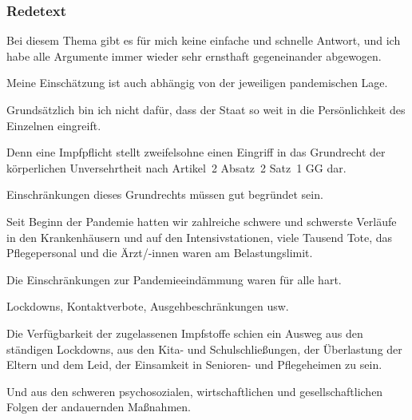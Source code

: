 \documentclass{article}
\begin{document}
\subsubsection{Redetext}
\colorbox{CustomColor0}{\parbox{\linewidth}{Bei diesem Thema gibt es für mich keine einfache und schnelle Antwort, und ich habe alle Argumente immer wieder sehr ernsthaft gegeneinander abgewogen.}}

\colorbox{CustomColor1}{\parbox{\linewidth}{Meine Einschätzung ist auch abhängig von der jeweiligen pandemischen Lage.}}

\colorbox{CustomColor2}{\parbox{\linewidth}{Grundsätzlich bin ich nicht dafür, dass der Staat so weit in die Persönlichkeit des Einzelnen eingreift.}}

\colorbox{CustomColor3}{\parbox{\linewidth}{Denn eine Impfpflicht stellt zweifelsohne einen Eingriff in das Grundrecht der körperlichen Unversehrtheit nach Artikel 2 Absatz 2 Satz 1 GG dar.}}

\colorbox{CustomColor4}{\parbox{\linewidth}{Einschränkungen dieses Grundrechts müssen gut begründet sein.}}

\colorbox{CustomColor5}{\parbox{\linewidth}{Seit Beginn der Pandemie hatten wir zahlreiche schwere und schwerste Verläufe in den Krankenhäusern und auf den Intensivstationen, viele Tausend Tote, das Pflegepersonal und die Ärzt/-innen waren am Belastungslimit.}}

\colorbox{CustomColor6}{\parbox{\linewidth}{Die Einschränkungen zur Pandemieeindämmung waren für alle hart.}}

\colorbox{CustomColor7}{\parbox{\linewidth}{Lockdowns, Kontaktverbote, Ausgehbeschränkungen usw.}}

\colorbox{CustomColor8}{\parbox{\linewidth}{Die Verfügbarkeit der zugelassenen Impfstoffe schien ein Ausweg aus den ständigen Lockdowns, aus den Kita- und Schulschließungen, der Überlastung der Eltern und dem Leid, der Einsamkeit in Senioren- und Pflegeheimen zu sein.}}

\colorbox{CustomColor9}{\parbox{\linewidth}{Und aus den schweren psychosozialen, wirtschaftlichen und gesellschaftlichen Folgen der andauernden Maßnahmen.}}
\end{document}
